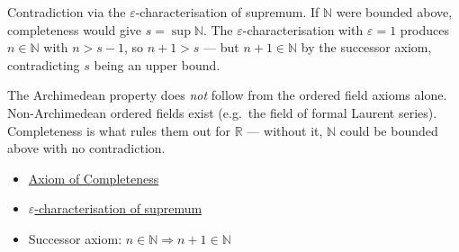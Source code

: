 \begin{remark*}
Contradiction via the $\varepsilon$-characterisation of supremum.
If $\mathbb{N}$ were bounded above, completeness would give $s = \sup\mathbb{N}$.
The $\varepsilon$-characterisation with $\varepsilon = 1$ produces $n \in \mathbb{N}$
with $n > s - 1$, so $n + 1 > s$ — but $n+1 \in \mathbb{N}$ by the successor axiom,
contradicting $s$ being an upper bound.

\end{remark*}

\begin{remark*}
The Archimedean property does \emph{not} follow from the ordered field axioms alone.
Non-Archimedean ordered fields exist (e.g.\ the field of formal Laurent series).
Completeness is what rules them out for $\mathbb{R}$ --- without it,
$\mathbb{N}$ could be bounded above with no contradiction.
\end{remark*}

\begin{dependencies}
\begin{itemize}
  \item \hyperref[axiom:completeness]{Axiom of Completeness}
  \item \hyperref[thm:supremum-approximation]{$\varepsilon$-characterisation of supremum}
  \item Successor axiom: $n \in \mathbb{N} \Rightarrow n+1 \in \mathbb{N}$
\end{itemize}
\end{dependencies}
